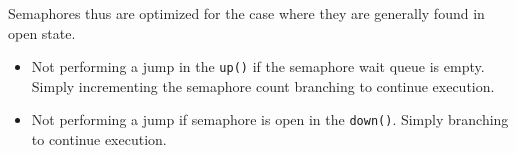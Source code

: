 \documentclass{article}
\begin{document}
Semaphores thus are optimized for the case where they are generally
found in open state. 

\begin{itemize}
  \item Not performing a jump in the \lstinline{up()} if the semaphore
    wait queue is empty. Simply incrementing the semaphore count
    branching to continue execution.

  \item Not performing a jump if semaphore is open in the
    \lstinline{down()}. Simply branching to continue execution.    
\end{itemize}










    
\end{document}
